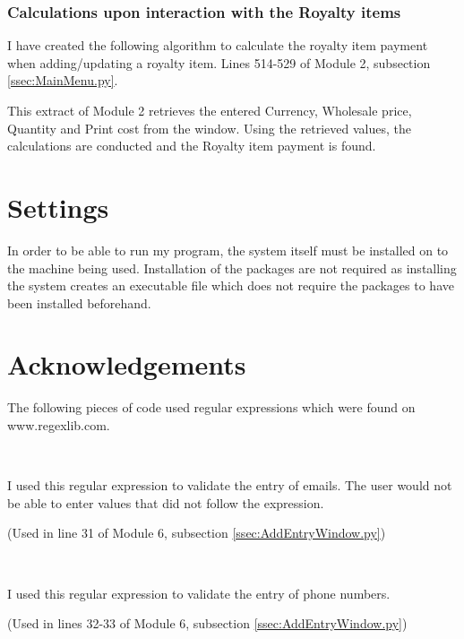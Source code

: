 \subsubsection{Calculations upon interaction with the Royalty items}
I have created the following algorithm to calculate the royalty item payment when adding/updating a royalty item.
Lines 514-529 of Module 2, subsection \ref{ssec:MainMenu.py}.
\begin{tiny}
\end{tiny}
This extract of Module 2 retrieves the entered Currency, Wholesale price, Quantity and Print cost from the window. Using the retrieved values, the calculations are conducted and the Royalty item payment is found.

\section{Settings}

In order to be able to run my program, the system itself must be installed on to the machine being used. Installation of the packages are not required as installing the system creates an executable file which does not require the packages to have been installed beforehand. 

\section{Acknowledgements}
The following pieces of code used regular expressions which were found on www.regexlib.com.

\
\

I used this regular expression to validate the entry of emails. The user would not be able to enter values that did not follow the expression.

\begin{tiny}
\end{tiny}
(Used in line 31 of Module 6, subsection \ref{ssec:AddEntryWindow.py})

\

I used this regular expression to validate the entry of phone numbers.

\begin{tiny}
\end{tiny}
(Used in lines 32-33 of Module 6, subsection \ref{ssec:AddEntryWindow.py})

